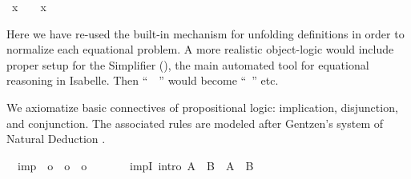 \begin{isabellebody}
\ {}x\ {}\ {}\ {}\ x{}\ \isamarkupfalse%
%
\endisatagproof
{\isafoldproof}%
%
\isadelimproof
%
\endisadelimproof
%
\begin{isamarkuptext}%
\noindent Here we have re-used the built-in mechanism for unfolding
  definitions in order to normalize each equational problem.  A more
  realistic object-logic would include proper setup for the Simplifier
  (), the main automated tool for equational
  reasoning in Isabelle.  Then ``\hyperlink{command.unfolding}{\mbox{}}~~\hyperlink{command.ddot}{\mbox{}}'' would become ``\hyperlink{command.by}{\mbox{}}~'' etc.%
\end{isamarkuptext}%
\isamarkuptrue%
\isamarkupfalse%
%
\isamarkuptrue%
%
\begin{isamarkuptext}%
We axiomatize basic connectives of propositional logic: implication,
  disjunction, and conjunction.  The associated rules are modeled
  after Gentzen's system of Natural Deduction \cite{Gentzen:1935}.%
\end{isamarkuptext}%
\isamarkuptrue%
\isamarkupfalse%
\isanewline
\ \ imp\ {}{}\ {}o\ {}\ o\ {}\ o{}\ \ {}\ {}{}{}\ {}{}{}\ \isanewline
\ \ impI\ {}intro{}{}\ {}{}A\ {}\ B{}\ {}\ A\ {}\ B{}\ \isanewline

\end{isabellebody}
